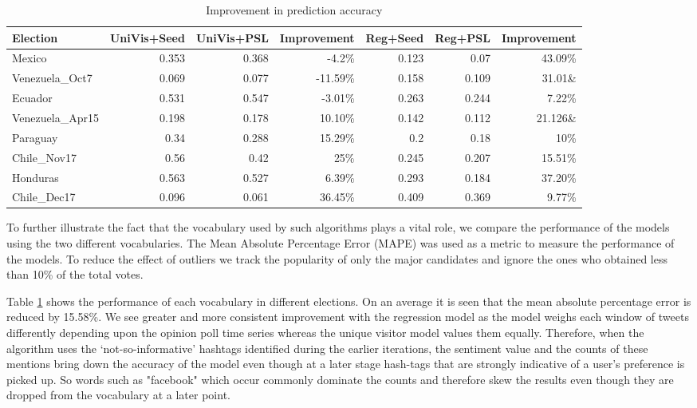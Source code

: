 \begin{table}
	\centering
	\begin{tabular}{| l || r | r | r | r | r | r |}
 	\hline
 	Election & UniVis+Seed & UniVis+PSL & Improvement & Reg+Seed & Reg+PSL & Improvement\\
 	\hline
	Mexico & 0.353 & 0.368 & -4.2\% & 0.123 & 0.07 & 43.09\% \\ 	
 	Venezuela\_Oct7 & 0.069	& 0.077 & -11.59\% & 0.158 & 0.109 & 31.01\&\\
	Ecuador & 0.531 & 0.547 & -3.01\% & 0.263 & 0.244 & 7.22\% \\
	Venezuela\_Apr15 & 0.198 & 0.178 & 10.10\% & 0.142 & 0.112 & 21.126\&\\
	Paraguay & 0.34 & 0.288 & 15.29\% & 0.2 & 0.18 & 10\% \\
	Chile\_Nov17 & 0.56 & 0.42 & 25\% & 0.245 & 0.207 & 15.51\% \\
	Honduras & 0.563 & 0.527 & 6.39\% & 0.293 & 0.184 & 37.20\% \\
	Chile\_Dec17 & 0.096 & 0.061 & 36.45\% & 0.409 & 0.369 & 9.77\% \\
 	\hline
	\end{tabular}
	\caption{Improvement in prediction accuracy}
	\label{table:improvement}
\end{table}	

To further illustrate the fact that the vocabulary used by such algorithms plays a vital role, we compare the performance of the models using the two different vocabularies.
The Mean Absolute Percentage Error (MAPE) was used as a metric to measure the performance of the models. 
To reduce the effect of outliers we track the popularity of only the major candidates and ignore the ones who obtained less than 10\% of the total votes.


Table \ref{table:improvement} shows the performance of each vocabulary in different elections. 
On an average it is seen that the mean absolute percentage error is reduced by 15.58\%.
We see greater and more consistent improvement with the regression model as the model weighs each window of tweets differently depending upon the opinion poll time series whereas the unique visitor model values them equally. 
Therefore, when the algorithm uses the `not-so-informative' hashtags identified during 
the earlier iterations, the sentiment value and the counts of these mentions bring down the accuracy of the model even though at a later stage hash-tags that are strongly indicative of a user's preference is picked up.
So words such as "facebook" which occur commonly dominate the counts and therefore skew the results even though they are dropped from the vocabulary at a later point.
